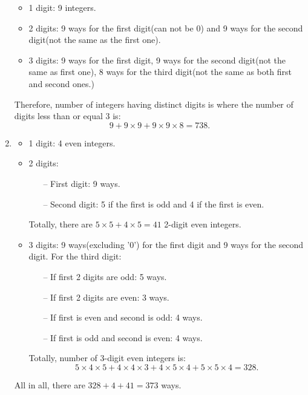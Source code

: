 \documentclass[a4paper]{article}
\begin{document}
\begin{enumerate}[label = \textbf{\alph*)}]
        \begin{itemize}
            \item 1 digit: 9 integers.
            \item 2 digits: 9 ways for the first digit(can not be 0) and 9 ways for the second digit(not the same as the first one).
            \item 3 digits: 9 ways for the first digit, 9 ways for the second digit(not the same as first one), 8 ways for the third digit(not the same as both first and second ones.)
        \end{itemize}
        Therefore, number of integers having distinct digits is where the number of digits less than or equal 3 is:
        \begin{equation*}
            9 + 9 \times 9 + 9 \times 9 \times 8 = 738.
        \end{equation*}

        \item  
        \begin{itemize} 
            \item 1 digit: 4 even integers.
            \item 2 digits: 
            \begin{itemize}
                \item[--] First digit: 9 ways.
                \item[--] Second digit: 5 if the first is odd and 4 if the first is even.
            \end{itemize}
            Totally, there are $5 \times 5 + 4\times 5 = 41$ 2-digit even integers.
            \item 3 digits: 9 ways(excluding '0') for the first digit and 9 ways for the second digit. For the third digit:
            \begin{itemize}
                \item[--] If first 2 digits are odd: 5 ways.
                \item[--] If first 2 digits are even: 3 ways.
                \item[--] If first is even and second is odd: 4 ways.
                \item[--] If first is odd and second is even: 4 ways.
            \end{itemize}
            Totally, number of 3-digit even integers is:
            \begin{equation*}
                5 \times 4 \times 5 + 4 \times 4 \times 3 + 4 \times 5 \times 4 + 5 \times 5 \times 4 = 328.
            \end{equation*}
        \end{itemize}
        All in all, there are $328 + 4 + 41 = 373$ ways.
	\end{enumerate}
        
\end{document}
